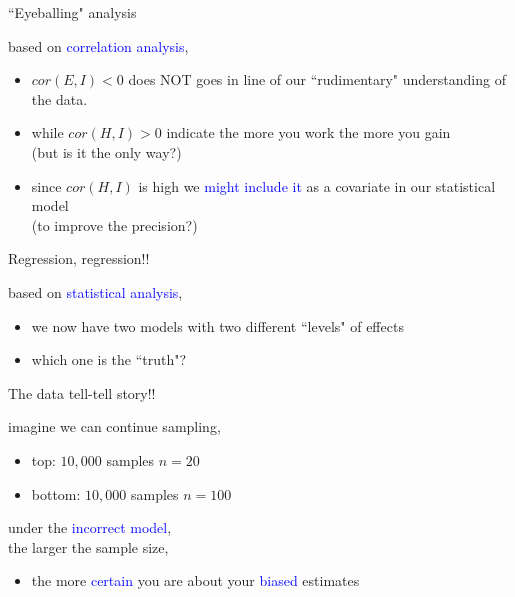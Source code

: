 %
%
\begin{lhframe}[rhgraphic={\texttt{[image: descendant3\_panel.pdf]}}]
	{``Eyeballing" analysis}
	
	based on \textcolor{blue}{correlation analysis},
	\begin{itemize}
		\item $cor(E, I)<0$ does NOT goes in line of our ``rudimentary" understanding of the data.
		\item while $cor(H, I)>0$ indicate the more you work the more you gain \\
		{\small (but is it the only way?)}
		\item since $cor(H, I)$ is high we \textcolor{blue}{might include it} as a covariate in our statistical model \\
		{\small (to improve the precision?)}
	\end{itemize}
\end{lhframe}
%
%
\begin{lhframe}[rhgraphic={\texttt{[image: descendant3\_reg.png]}}]
	{Regression, regression!!}
	
	based on \textcolor{blue}{statistical analysis},
	\begin{itemize}
		\item we now have two models with two different ``levels" of effects
		\item which one is the ``truth"?
	\end{itemize}
\end{lhframe}
%
%
\begin{lhframe}[rhgraphic={\texttt{[image: descendant3\_samplesize.pdf]}}]
	{The data tell-tell story!!}
	
	imagine we can continue sampling,
	\begin{itemize}
		\item top: $10,000$ samples $n=20$
		\item bottom: $10,000$ samples $n=100$
	\end{itemize}
	
	under the \textcolor{blue}{incorrect model},\\
	the larger the sample size,
	\begin{itemize}
		\item the more \textcolor{blue}{certain} you are about your \textcolor{blue}{biased} estimates
	\end{itemize}
\end{lhframe}
%
%
